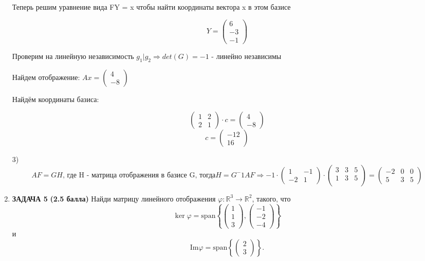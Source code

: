 \documentclass[a4paper,12pt]{article}
\begin{document}
\begin{enumerate}
Теперь решим уравнение вида FY = x чтобы найти координаты вектора x в этом базисе

\[
Y = \begin{pmatrix}
    6 \\
    -3\\
    -1
\end{pmatrix}
\]

Проверим на линейную независимость $g_1|g_2 \Rightarrow det(G)= -1$ - линейно независимы 

Найдем отображение: $Ax = \begin{pmatrix}
    4\\
    -8
\end{pmatrix}$

Найдём координаты базиса: 

\[
\begin{pmatrix}
    1 & 2 \\
    2 & 1 
\end{pmatrix} \cdot
c = \begin{pmatrix}
    4\\
    -8
\end{pmatrix}
\]
\[
c = \begin{pmatrix}
    -12 \\
    16
\end{pmatrix}
\]

3)
\[
AF=GH\text{, где H - матрица отображения в базисе G, тогда} H = G^-1AF \Rightarrow -1\cdot \begin{pmatrix}
    1 & -1 \\
    -2 & 1
\end{pmatrix} \cdot 

\begin{pmatrix}
    3 & 3 & 5 \\
    1 & 3 & 5 \\
\end{pmatrix} = 

\begin{pmatrix}
    -2 & 0 & 0 \\
    5 & 3 & 5 
\end{pmatrix} 
\]


    \item \textbf{ЗАДАЧА 5} \textbf{(2.5 балла)} Найди матрицу линейного отображения $\varphi: \mathbb{R}^3 \to \mathbb{R}^2$, такого, что
    \[
    \ker \varphi = \text{span} \left\{ 
    \begin{pmatrix} 1 \\ 1 \\ 3 \end{pmatrix}, 
    \begin{pmatrix} -1 \\ -2 \\ -4 \end{pmatrix} 
    \right\}
    \]
    и
    \[
    \text{Im} \varphi = \text{span} \left\{ 
    \begin{pmatrix} 2 \\ 3 \end{pmatrix} 
    \right\}.
    \]


\end{enumerate}
\end{document}
